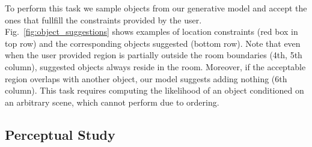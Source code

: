 \documentclass{article}
\newcommand{\figref}[1]{Fig.~\ref{#1}}
\begin{document}
To perform this task we sample objects from our generative model and accept the ones that fullfill the constraints provided by the user.
\figref{fig:object_suggestions} shows examples of location constraints (red box
in top row) and the corresponding objects suggested (bottom row). Note that
even when the user provided region is partially outside the room
boundaries (4th, 5th column), suggested objects always reside in the room.
Moreover, if the acceptable region overlaps with another object, our model
suggests adding nothing (6th column). This task requires computing the likelihood of an object conditioned on an
arbitrary scene, which \cite{Wang2020ARXIV,Ritchie2019CVPR}
cannot perform due to ordering.

\subsection{Perceptual Study}
\end{document}
